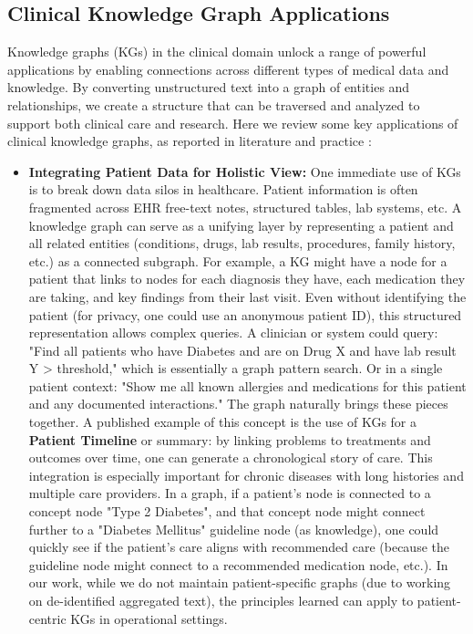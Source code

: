 \subsection{Clinical Knowledge Graph Applications}

Knowledge graphs (KGs) in the clinical domain unlock a range of powerful applications by enabling connections across different types of medical data and knowledge. By converting unstructured text into a graph of entities and relationships, we create a structure that can be traversed and analyzed to support both clinical care and research. Here we review some key applications of clinical knowledge graphs, as reported in literature and practice \cite{Milvus2025}:

\begin{itemize}
\item \textbf{Integrating Patient Data for Holistic View:} One immediate use of KGs is to break down data silos in healthcare. Patient information is often fragmented across EHR free-text notes, structured tables, lab systems, etc. A knowledge graph can serve as a unifying layer by representing a patient and all related entities (conditions, drugs, lab results, procedures, family history, etc.) as a connected subgraph. For example, a KG might have a node for a patient that links to nodes for each diagnosis they have, each medication they are taking, and key findings from their last visit. Even without identifying the patient (for privacy, one could use an anonymous patient ID), this structured representation allows complex queries. A clinician or system could query: "Find all patients who have Diabetes and are on Drug X and have lab result Y > threshold," which is essentially a graph pattern search. Or in a single patient context: "Show me all known allergies and medications for this patient and any documented interactions." The graph naturally brings these pieces together. A published example of this concept is the use of KGs for a \textbf{Patient Timeline} or summary: by linking problems to treatments and outcomes over time, one can generate a chronological story of care. This integration is especially important for chronic diseases with long histories and multiple care providers. In a graph, if a patient's node is connected to a concept node "Type 2 Diabetes", and that concept node might connect further to a "Diabetes Mellitus" guideline node (as knowledge), one could quickly see if the patient's care aligns with recommended care (because the guideline node might connect to a recommended medication node, etc.). In our work, while we do not maintain patient-specific graphs (due to working on de-identified aggregated text), the principles learned can apply to patient-centric KGs in operational settings.


\end{itemize}

